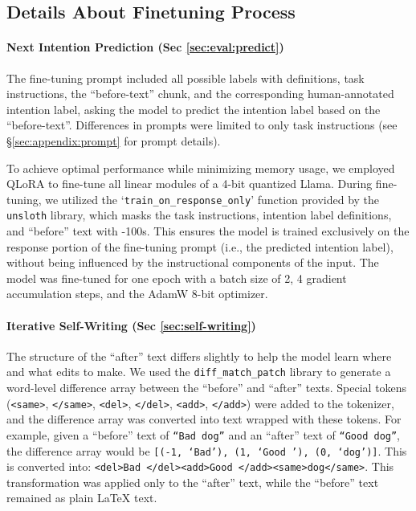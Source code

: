 \subsection{Details About Finetuning Process}\label{sec:appendix:finetuning}

\paragraph{Next Intention Prediction (Sec \ref{sec:eval:predict})} 
The fine-tuning prompt included all possible labels with definitions, task instructions, the ``before-text'' chunk, and the corresponding human-annotated intention label, asking the model to predict the intention label based on the ``before-text''. Differences in prompts were limited to only task instructions (see \S \ref{sec:appendix:prompt} for prompt details). 


To achieve optimal performance while minimizing memory usage, we employed QLoRA \cite{dettmers2024qlora} to fine-tune all linear modules of a 4-bit quantized Llama. During fine-tuning, we utilized the `\texttt{train\_on\_response\_only}' function provided by the \texttt{unsloth} library, which masks the task instructions, intention label definitions, and ``before'' text with -100s. This ensures the model is trained exclusively on the response portion of the fine-tuning prompt (i.e., the predicted intention label), without being influenced by the instructional components of the input. The model was fine-tuned for one epoch with a batch size of 2, 4 gradient accumulation steps, and the AdamW 8-bit optimizer.

\paragraph{Iterative Self-Writing (Sec \ref{sec:self-writing})}
The structure of the ``after'' text differs slightly to help the model learn where and what edits to make. We used the \texttt{diff\_match\_patch} library to generate a word-level difference array between the  ``before'' and ``after'' texts. Special tokens (\texttt{<same>}, \texttt{</same>}, \texttt{<del>}, \texttt{</del>}, \texttt{<add>}, \texttt{</add>}) were added to the tokenizer, and the difference array was converted into text wrapped with these tokens. For example, given a ``before'' text of \texttt{``Bad dog''} and an ``after'' text of \texttt{``Good dog''}, the difference array would be \texttt{[(-1, `Bad'), (1, `Good '), (0, `dog')]}. This is converted into: \texttt{<del>Bad </del><add>Good </add><same>dog</same>}. This transformation was applied only to the ``after'' text, while the ``before'' text remained as plain LaTeX text.


